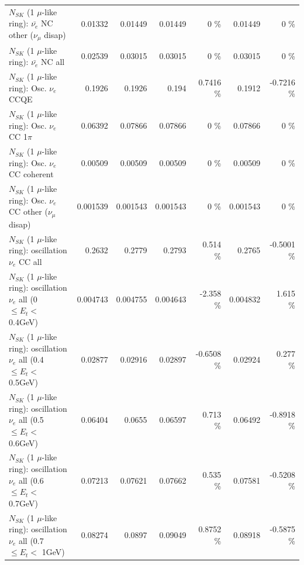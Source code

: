 \begin{table}
\begin{tabular}{| l | r | r | r  r | r  r |}
          $N_{SK}$ (1 $\mu$-like ring): $\bar{\nu_e}$ NC other ($\nu_\mu$ disap) &         0.01332 &         0.01449 &         0.01449 &        0 \%  &         0.01449 &        0 \%  \\ 
                            $N_{SK}$ (1 $\mu$-like ring): $\bar{\nu_{e}}$ NC all &         0.02539 &         0.03015 &         0.03015 &        0 \%  &         0.03015 &        0 \%  \\ 
\hline
\hline
\hline
                                 $N_{SK}$ (1 $\mu$-like ring): Osc. $\nu_e$ CCQE &          0.1926 &          0.1926 &           0.194 &   0.7416 \%  &          0.1912 &  -0.7216 \%  \\ 
                            $N_{SK}$ (1 $\mu$-like ring): Osc. $\nu_e$ CC 1$\pi$ &         0.06392 &         0.07866 &         0.07866 &        0 \%  &         0.07866 &        0 \%  \\ 
                          $N_{SK}$ (1 $\mu$-like ring): Osc. $\nu_e$ CC coherent &         0.00509 &         0.00509 &         0.00509 &        0 \%  &         0.00509 &        0 \%  \\ 
           $N_{SK}$ (1 $\mu$-like ring): Osc. $\nu_e$ CC other ($\nu_\mu$ disap) &        0.001539 &        0.001543 &        0.001543 &        0 \%  &        0.001543 &        0 \%  \\ 
                        $N_{SK}$ (1 $\mu$-like ring): oscillation $\nu_e$ CC all &          0.2632 &          0.2779 &          0.2793 &    0.514 \%  &          0.2765 &  -0.5001 \%  \\ 
\hline
$N_{SK}$ (1 $\mu$-like ring): oscillation $\nu_{e}$ all (0 $\leq E_{t} <$ 0.4GeV) &        0.004743 &        0.004755 &        0.004643 &   -2.358 \%  &        0.004832 &    1.615 \%  \\ 
$N_{SK}$ (1 $\mu$-like ring): oscillation $\nu_{e}$ all (0.4 $\leq E_{t} <$ 0.5GeV) &         0.02877 &         0.02916 &         0.02897 &  -0.6508 \%  &         0.02924 &    0.277 \%  \\ 
$N_{SK}$ (1 $\mu$-like ring): oscillation $\nu_{e}$ all (0.5 $\leq E_{t} <$ 0.6GeV) &         0.06404 &          0.0655 &         0.06597 &    0.713 \%  &         0.06492 &  -0.8918 \%  \\ 
$N_{SK}$ (1 $\mu$-like ring): oscillation $\nu_{e}$ all (0.6 $\leq E_{t} <$ 0.7GeV) &         0.07213 &         0.07621 &         0.07662 &    0.535 \%  &         0.07581 &  -0.5208 \%  \\ 
$N_{SK}$ (1 $\mu$-like ring): oscillation $\nu_{e}$ all (0.7 $\leq E_{t} <$ 1GeV) &         0.08274 &          0.0897 &         0.09049 &   0.8752 \%  &         0.08918 &  -0.5875 \%  \\ 

\end{tabular}
\end{table}
